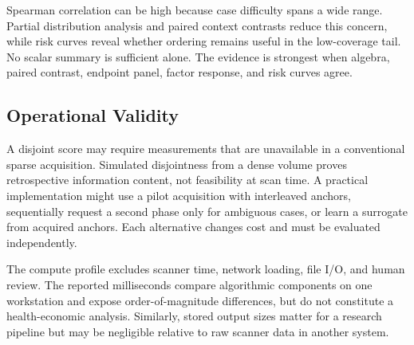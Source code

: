 \documentclass[journal,10pt]{IEEEtran}
\begin{document}
Spearman correlation can be high because case difficulty spans a wide range. Partial distribution analysis and paired context contrasts reduce this concern, while risk curves reveal whether ordering remains useful in the low-coverage tail. No scalar summary is sufficient alone. The evidence is strongest when algebra, paired contrast, endpoint panel, factor response, and risk curves agree.

\subsection{Operational Validity}
A disjoint score may require measurements that are unavailable in a conventional sparse acquisition. Simulated disjointness from a dense volume proves retrospective information content, not feasibility at scan time. A practical implementation might use a pilot acquisition with interleaved anchors, sequentially request a second phase only for ambiguous cases, or learn a surrogate from acquired anchors. Each alternative changes cost and must be evaluated independently.

The compute profile excludes scanner time, network loading, file I/O, and human review. The reported milliseconds compare algorithmic components on one workstation and expose order-of-magnitude differences, but do not constitute a health-economic analysis. Similarly, stored output sizes matter for a research pipeline but may be negligible relative to raw scanner data in another system.
\end{document}
